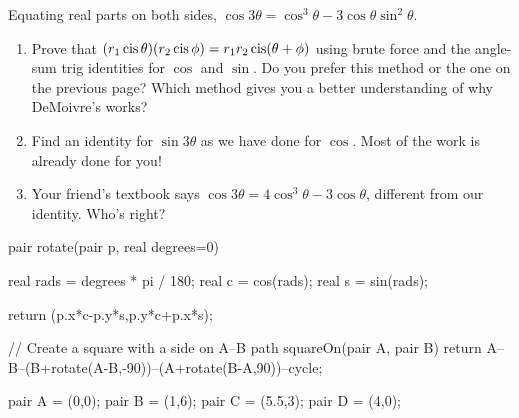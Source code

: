 \documentclass[../textbook.tex]{subfiles}
\begin{document}
\noindent Equating real parts on both sides, $\cos 3\theta = \cos^3\theta - 3\cos\theta\sin^2\theta$.

\begin{enumerate}
\setcounter{enumi}{\value{problem_i}}
\item Prove that $(r_1\operatorname{cis} \theta)(r_2\operatorname{cis} \phi) = r_1r_2 \operatorname{cis}(\theta + \phi)$ using brute force and the angle-sum trig identities for $\cos$ and $\sin$. Do you prefer this method or the one on the previous page? Which method gives you a better understanding of why DeMoivre's works?
\item Find an identity for $\sin 3\theta$ as we have done for $\cos$. Most of the work is already done for you!
\item Your friend's textbook says $\cos 3\theta = 4\cos^3\theta - 3\cos \theta$, different from our identity. Who's right?

\setcounter{problem_i}{\value{enumi}}
\end{enumerate}

\begin{asydef}
pair rotate(pair p, real degrees=0) {
	real rads = degrees * pi / 180;
	real c = cos(rads);
	real s = sin(rads);

	return (p.x*c-p.y*s,p.y*c+p.x*s);
}

// Create a square with a side on A--B
path squareOn(pair A, pair B) {
	return A--B--(B+rotate(A-B,-90))--(A+rotate(B-A,90))--cycle;
}

pair A = (0,0);
pair B = (1,6);
pair C = (5.5,3);
pair D = (4,0);
\end{asydef}
\end{document}
